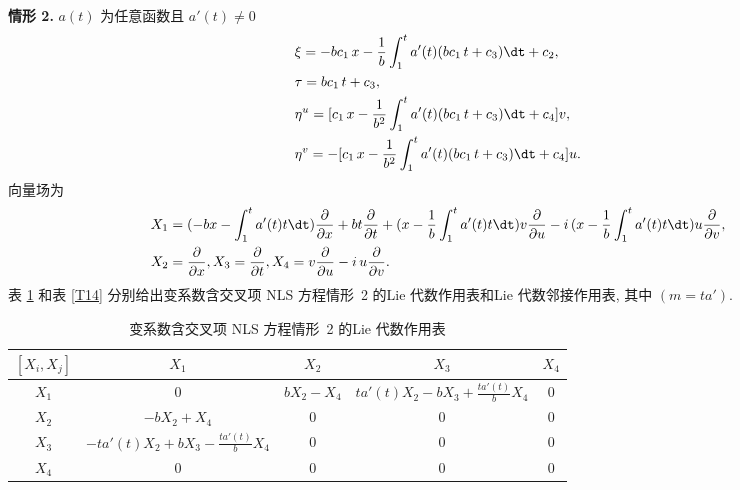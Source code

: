 \noindent \textbf{情形 2.} $a(t)$ 为任意函数且 $a'(t)\neq 0$
\begin{equation}
\begin{aligned}
&\xi=-bc_1\,x-\frac{1}{b}\int_1^t a'(t)(bc_1\,t+c_3)\dt+c_2,\\
&\tau=bc_1\,t+c_3,\\
&\eta^u=[c_1\,x-\frac{1}{b^2}\int_1^t a'(t)(bc_1\,t+c_3)\dt +c_4]v,\\
&\eta^v=-[c_1\,x-\frac{1}{b^2}\int_1^t a'(t)(bc_1\,t+c_3)\dt +c_4]u.
\end{aligned}
\end{equation}
向量场为
\begin{align}\label{a(t)_X}
&X_1=(-bx-\int_1^ta'(t)t\dt)\frac{\partial}{\partial x}+bt\frac{\partial}{\partial t}+(x-\frac{1}{b}\int_1^ta'(t)t\dt)v\frac{\partial}{\partial u}-i\,(x-\frac{1}{b}\int_1^ta'(t)t\dt)u\frac{\partial}{\partial v},\notag\\
&X_2=\frac{\partial}{\partial x},
X_3=\frac{\partial}{\partial t},
X_4=v\frac{\partial}{\partial u}-i\,u\frac{\partial}{\partial v}.
\end{align}
表 \ref{T13} 和表 \ref{T14} 分别给出变系数含交叉项 NLS 方程情形~2 的Lie 代数作用表和Lie 代数邻接作用表, 其中 $(m=ta')$.
\begin{table}\caption{变系数含交叉项 NLS 方程情形~2 的Lie 代数作用表}\label{T13}
\begin{center}
\begin{tabular}[Table 3]{|c|c|c|c|c|}
  \hline
  $[X_i,X_j]$ & $X_1$ & $X_2$ & $X_3$ & $X_4$\\
  \hline
  $X_1$ & 0 & $bX_2-X_4$ & $ta'(t)X_2-bX_3+\frac{ta'(t)}{b}X_4$ & $0$\\
  \hline
  $X_2$ & $-bX_2+X_4$ & 0 & 0 & $0$\\\hline
  $X_3$ & $-ta'(t)X_2+bX_3-\frac{ta'(t)}{b}X_4$ & 0 & 0 & $0$\\
  \hline
  $X_4$ & $0$ & $0$ & $0$ & $0$\\
  \hline
\end{tabular}
\end{center}
\end{table}
